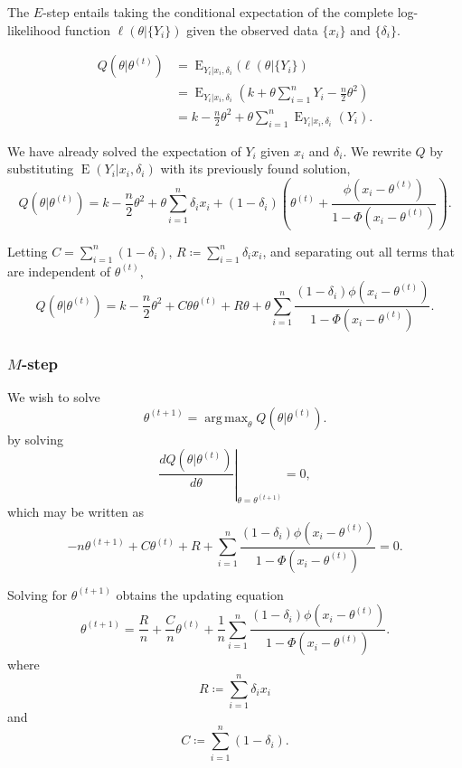 \documentclass[
]{article}
\begin{document}
The \(E\)-step entails taking the conditional expectation of the
complete log-likelihood function \(\ell(\theta | \{Y_i\})\) given the
observed data \(\{x_i\}\) and \(\{\delta_i\}\).

\begin{align}
  Q(\theta | \theta^{(t)})
    &= \operatorname{E}_{Y_i | x_i,\delta_i}(\ell(\theta | \{Y_i\})\\
    &= \operatorname{E}_{Y_i | x_i,\delta_i}\left(k + \theta \sum_{i=1}^{n} Y_i - \frac{n}{2} \theta^2\right)\\
    &= k - \frac{n}{2}\theta^2 + \theta \sum_{i=1}^{n} \operatorname{E}_{Y_i | x_i,\delta_i}(Y_i).
\end{align}

We have already solved the expectation of \(Y_i\) given \(x_i\) and
\(\delta_i\). We rewrite \(Q\) by substituting
\(\operatorname{E}(Y_i | x_i, \delta_i)\) with its previously found
solution, \[
  Q(\theta | \theta^{(t)}) = k - \frac{n}{2}\theta^2 + \theta \sum_{i=1}^{n} \delta_i x_i + (1-\delta_i) \left(\theta^{(t)} + \frac{\phi(x_i-\theta^{(t)})}{1 - \Phi(x_i-\theta^{(t)})}\right).
\]

Letting \(C = \sum_{i=1}^{n} (1 - \delta_i)\),
\(R \coloneqq \sum_{i=1}^{n} \delta_i x_i\), and separating out all
terms that are independent of \(\theta^{(t)}\), \[
  Q(\theta | \theta^{(t)}) = k - \frac{n}{2}\theta^2 + C \theta \theta^{(t)} + R \theta
    + \theta \sum_{i=1}^{n} \frac{(1-\delta_i)\phi(x_i-\theta^{(t)})}{1 - \Phi(x_i-\theta^{(t)})}.
\]

\hypertarget{m-step}{%
\subsubsection{\texorpdfstring{\(M\)-step}{M-step}}\label{m-step}}

We wish to solve \[
  \theta^{(t+1)} = \operatorname{arg\,max}_{\theta} Q(\theta | \theta^{(t)}).
\] by solving \[
  \left. \frac{d Q(\theta | \theta^{(t)})}{d \theta} \right\vert_{\theta=\theta^{(t+1)}} = 0,
\] which may be written as \[
  -n\theta^{(t+1)} + C \theta^{(t)} + R + \sum_{i=1}^{n} \frac{(1-\delta_i)\phi(x_i-\theta^{(t)})}{1 - \Phi(x_i-\theta^{(t)})} = 0.
\]

Solving for \(\theta^{(t+1)}\) obtains the updating equation \[
  \theta^{(t+1)} = \frac{R}{n} + \frac{C}{n} \theta^{(t)} + \frac{1}{n}\sum_{i=1}^{n}\frac{(1-\delta_i)\phi(x_i-\theta^{(t)})}{1 - \Phi(x_i-\theta^{(t)})}.
\] where \[
  R \coloneqq \sum_{i=1}^{n} \delta_i x_i
\] and \[
  C \coloneqq \sum_{i=1}^{n} (1-\delta_i).
\]
\end{document}
